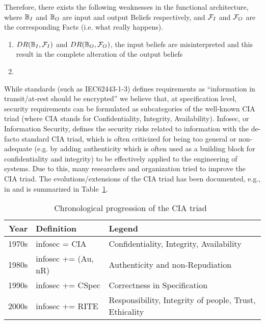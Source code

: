 Therefore, there exists the following weaknesses in the functional
architecture, where $\mathbb{B}_I$ and $\mathbb{B}_O$ are input and
output Beliefs respectively, and $\mathcal{F}_I$ and $\mathcal{F}_O$ are
the corresponding Facts (i.e. what really happens).
\begin{enumerate}
	\item $DR(\mathbb{B}_I,\mathcal{F}_I)$ and
		$DR(\mathbb{B}_O,\mathcal{F}_O)$, the input beliefs are
		misinterpreted and this result in the complete alteration of the
		output beliefs
	\item {}
\end{enumerate}


While standards (such
as IEC62443-1-3) defines requirements as
``information in transit/at-rest should be encrypted'' we believe that, at
specification level, security requirements can be formulated as subcategories of
the well-known CIA triad (where CIA stands for Confidentiality, Integrity,
Availability).
Infosec, or Information Security, defines the security risks related to
information with the de-facto standard CIA triad, which is often criticized
\autocite{CIAcriticismCPS} for being too general or non-adequate (e.g. by
adding authenticity which is often used as a building block for confidentiality
and integrity) to be effectively applied to the engineering of systems. Due to
this, many researchers and organization tried to improve the CIA triad.  The
evolutions/extensions of the CIA triad has been documented, e.g., in
\autocite{Samonas2014cia} and is summarized in Table~\ref{tab:ciaevolution}.

\begin{table}[h]
\centering
\small
\begin{tabular}{rll} 
	{\bf Year} & {\bf Definition} & {\bf Legend}\\
	\hline
	1970s & infosec = CIA & Confidentiality, Integrity, Availability\\
	1980s & infosec += (Au, nR) & Authenticity and non-Repudiation\\
	1990s & infosec += CSpec & Correctness in Specification\\
	2000s & infosec += RITE & Responsibility, Integrity of people, Trust, Ethicality
\end{tabular}
\caption{Chronological progression of the CIA triad~\label{tab:ciaevolution}}
\end{table}


